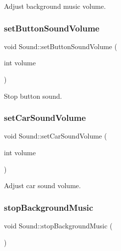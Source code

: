 Adjust background music volume. 

\mbox{\label{class_sound_a1a7459e2d4cd022f3fc53a0a91a40890}} 
\subsubsection{\texorpdfstring{setButtonSoundVolume}{setButtonSoundVolume}}
{\footnotesize\ttfamily void Sound\+::set\+Button\+Sound\+Volume (\begin{DoxyParamCaption}\item[{int}]{volume }\end{DoxyParamCaption})\hspace{0.3cm}{\ttfamily [slot]}}



Stop button sound. 

\mbox{\label{class_sound_afe4fc54be7b910501ae27c691fe4f300}} 
\subsubsection{\texorpdfstring{setCarSoundVolume}{setCarSoundVolume}}
{\footnotesize\ttfamily void Sound\+::set\+Car\+Sound\+Volume (\begin{DoxyParamCaption}\item[{int}]{volume }\end{DoxyParamCaption})\hspace{0.3cm}{\ttfamily [slot]}}



Adjust car sound volume. 

\mbox{\label{class_sound_a1f3858c62f1f8579eaa708df8c979890}} 
\subsubsection{\texorpdfstring{stopBackgroundMusic}{stopBackgroundMusic}}
{\footnotesize\ttfamily void Sound\+::stop\+Background\+Music (\begin{DoxyParamCaption}{ }\end{DoxyParamCaption})\hspace{0.3cm}{\ttfamily [slot]}}



